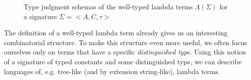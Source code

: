\begin{figure}
  \begin{prooftree}
  \end{prooftree}
  \begin{prooftree}
  \end{prooftree}
  \begin{prooftree}
  \end{prooftree}
  \begin{prooftree}
  \end{prooftree}
  \begin{prooftree}
  \end{prooftree}
  \begin{prooftree}
  \end{prooftree}
  \begin{prooftree}
  \end{prooftree}
  \caption{\label{fig:type-judgments} Type judgment schemas of the
    well-typed lambda terms $\Lambda(\Sigma)$ for a signature $\Sigma =
    \mathopen{<}A, C, \tau\mathclose{>}$}
\end{figure}

The definition of a well-typed lambda term already gives us an
interesting combinatorial structure. To make this structure even more
useful, we often focus ourselves only on terms that have a specific
\emph{distinguished type}. Using this notion of a signature of typed
constants and some distinguished type, we can describe languages of,
e.g. tree-like (and by extension string-like), lambda terms.

